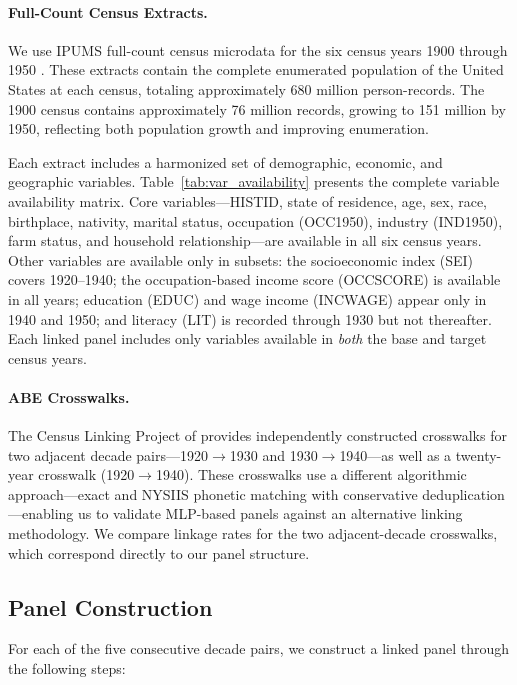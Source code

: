 \documentclass[12pt]{article}
\begin{document}
\paragraph{Full-Count Census Extracts.} We use IPUMS full-count census microdata for the six census years 1900 through 1950 \citep{ruggles2024}. These extracts contain the complete enumerated population of the United States at each census, totaling approximately 680 million person-records. The 1900 census contains approximately 76 million records, growing to 151 million by 1950, reflecting both population growth and improving enumeration.

Each extract includes a harmonized set of demographic, economic, and geographic variables. Table~\ref{tab:var_availability} presents the complete variable availability matrix. Core variables---HISTID, state of residence, age, sex, race, birthplace, nativity, marital status, occupation (OCC1950), industry (IND1950), farm status, and household relationship---are available in all six census years. Other variables are available only in subsets: the socioeconomic index (SEI) covers 1920--1940; the occupation-based income score (OCCSCORE) is available in all years; education (EDUC) and wage income (INCWAGE) appear only in 1940 and 1950; and literacy (LIT) is recorded through 1930 but not thereafter. Each linked panel includes only variables available in \textit{both} the base and target census years.

\paragraph{ABE Crosswalks.} The Census Linking Project of \citet{abramitzky2012, abramitzky2014} provides independently constructed crosswalks for two adjacent decade pairs---1920$\rightarrow$1930 and 1930$\rightarrow$1940---as well as a twenty-year crosswalk (1920$\rightarrow$1940). These crosswalks use a different algorithmic approach---exact and NYSIIS phonetic matching with conservative deduplication---enabling us to validate MLP-based panels against an alternative linking methodology. We compare linkage rates for the two adjacent-decade crosswalks, which correspond directly to our panel structure.

\subsection{Panel Construction}

For each of the five consecutive decade pairs, we construct a linked panel through the following steps:
\end{document}
